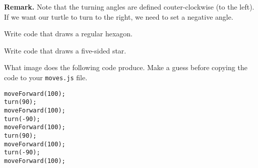 \documentclass[11pt,a4paper]{report}
\begin{document}
{\bf Remark.} Note that the turning angles are defined couter-clockwise (to the left). If we want our turtle to turn to the right, we need to set a negative angle.

\begin{ex}\label{ex17}
\begin{multicols}{2}
Write code that draws a regular hexagon.

\end{multicols}
\end{ex}

\begin{ex}\label{ex18}
\begin{multicols}{2}
Write code that draws a five-sided star. 

\end{multicols}
\end{ex}

\begin{ex}\label{ex19}
What image does the following code produce. Make a guess before copying the code to your \verb|moves.js| file.
\begin{verbatim}
moveForward(100);
turn(90);
moveForward(100);
turn(-90);
moveForward(100);
turn(90);
moveForward(100);
turn(-90);
moveForward(100);
\end{verbatim}
\end{ex}
\end{document}
